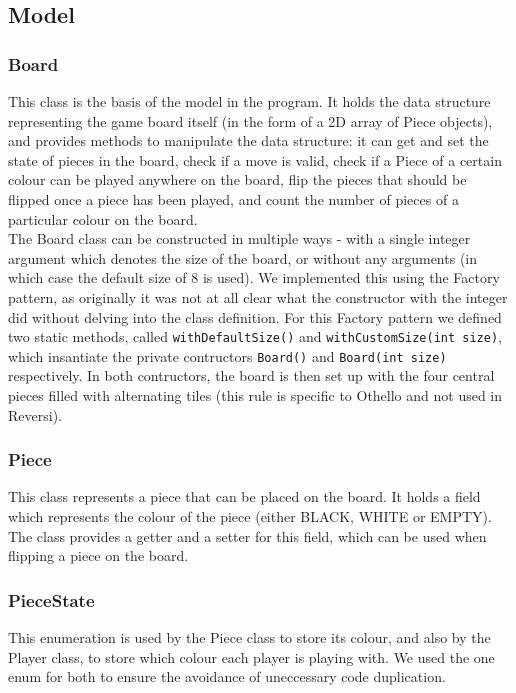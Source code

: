 \documentclass[11pt,a4paper,oneside]{article}
\begin{document}
\subsection*{Model}
\subsubsection*{Board}
This class is the basis of the model in the program. It holds the data structure representing the game board itself (in the form of a 2D array of Piece objects), and provides methods to manipulate the data structure: it can get and set the state of pieces in the board, check if a move is valid, check if a Piece of a certain colour can be played anywhere on the board, flip the pieces that should be flipped once a piece has been played, and count the number of pieces of a particular colour on the board.\\
\indent The Board class can be constructed in multiple ways - with a single integer argument which denotes the size of the board, or without any arguments (in which case the default size of 8 is used). We implemented this using the Factory pattern, as originally it was not at all clear what the constructor with the integer did without delving into the class definition. For this Factory pattern we defined two static methods, called \texttt{withDefaultSize()} and \texttt{withCustomSize(int size)}, which insantiate the private contructors \texttt{Board()} and \texttt{Board(int size)} respectively. In both contructors, the board is then set up with the four central pieces filled with alternating tiles (this rule is specific to Othello and not used in Reversi). 

\subsubsection*{Piece}
This class represents a piece that can be placed on the board. It holds a field which represents the colour of the piece (either BLACK, WHITE or EMPTY). The class provides a getter and a setter for this field, which can be used when flipping a piece on the board. 

\subsubsection*{PieceState}
This enumeration is used by the Piece class to store its colour, and also by the Player class, to store which colour each player is playing with. We used the one enum for both to ensure the avoidance of uneccessary code duplication.
\end{document}
